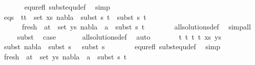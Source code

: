 \begin{isabellebody}
\ \ \ \ \ \isamarkupfalse%
\ equ{\isacharunderscore}{\kern0pt}refl\ subst{\isacharunderscore}{\kern0pt}equ{\isacharunderscore}{\kern0pt}def\ \isamarkupfalse%
\ simp\isanewline
\ \ \ \isamarkupfalse%
\ {}\isanewline
\ \ \ \isamarkupfalse%
\ eqs{\isacharcolon}{\kern0pt}\ {\isachardoublequoteopen}{\isasymforall}\ {\isacharparenleft}{\kern0pt}t{}{\isacharcomma}{\kern0pt}t{}{\isacharparenright}{\kern0pt}\ {\isasymin}\ set\ xs{\isachardot}{\kern0pt}\ nabla{}\ {\isasymturnstile}\ subst\ s{}\ t{}\ {\isasymapprox}\ subst\ s{}\ t{}{\isachardoublequoteclose}\ \isanewline
\ \ \ \ \ \ fresh{\isacharcolon}{\kern0pt}\ {\isachardoublequoteopen}{\isasymforall}\ {\isacharparenleft}{\kern0pt}a{\isacharcomma}{\kern0pt}t{\isacharparenright}{\kern0pt}\ {\isasymin}\ set\ ys{\isachardot}{\kern0pt}\ nabla{}\ {\isasymturnstile}\ a\ {\isasymsharp}\ subst\ s{}\ t{\isachardoublequoteclose}\ \isanewline
\ \ \ \ \ \isamarkupfalse%
\ all{\isacharunderscore}{\kern0pt}solutions{\isacharunderscore}{\kern0pt}def\ \isamarkupfalse%
\ simp{\isacharunderscore}{\kern0pt}all\isanewline
\ \ \ \isamarkupfalse%
\ subst\ \isamarkupfalse%
\ {\isacharquery}{\kern0pt}case\isanewline
\ \ \ \ \ \isamarkupfalse%
\ all{\isacharunderscore}{\kern0pt}solutions{\isacharunderscore}{\kern0pt}def\ \isamarkupfalse%
\ auto\isanewline
\ \isamarkupfalse%
\isanewline
\ \ \ \isamarkupfalse%
\ {\isacharparenleft}{\kern0pt}{}\ t{}\ t{}\ t{}\ t{}\ xs\ ys{\isacharparenright}{\kern0pt}\isanewline
\ \ \ \isamarkupfalse%
\ \isamarkupfalse%
\ subst{\isacharcolon}{\kern0pt}\ {\isachardoublequoteopen}nabla{}\ {\isasymTurnstile}\ subst\ {\isacharparenleft}{\kern0pt}s{}{\isasymbullet}\ {\isacharbrackleft}{\kern0pt}{\isacharbrackright}{\kern0pt}{\isacharparenright}{\kern0pt}\ {\isasymapprox}\ subst\ s{}{\isachardoublequoteclose}\ \isanewline
\ \ \ \ \ \isamarkupfalse%
\ equ{\isacharunderscore}{\kern0pt}refl\ subst{\isacharunderscore}{\kern0pt}equ{\isacharunderscore}{\kern0pt}def\ \isamarkupfalse%
\ simp\isanewline
\isanewline
\ \ \ \isamarkupfalse%
\ {}\isanewline
\ \ \ \isamarkupfalse%
\ fresh{\isacharcolon}{\kern0pt}\ {\isachardoublequoteopen}{\isasymforall}\ {\isacharparenleft}{\kern0pt}a{\isacharcomma}{\kern0pt}t{\isacharparenright}{\kern0pt}\ {\isasymin}\ set\ ys{\isachardot}{\kern0pt}\ nabla{}\ {\isasymturnstile}\ a\ {\isasymsharp}\ subst\ s{}\ t{\isachardoublequoteclose}\isanewline

\end{isabellebody}
